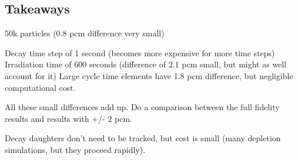 \subsection{Takeaways}

50k particles (0.8 pcm difference very small)

Decay time step of 1 second (becomes more expensive for more time steps)
Irradiation time of 600 seconds (difference of 2.1 pcm small, but might as well account for it)
Large cycle time elements have 1.8 pcm difference, but negligible computational cost.


All these small differences add up.
Do a comparison between the full fidelity results and results with +/- 2 pcm.

Decay daughters don't need to be tracked, but cost is small (many depletion simulations, but they proceed rapidly).